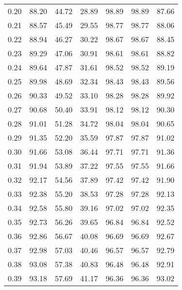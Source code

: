 \begin{tabular}{|c|c|c|c|c|c|c|}
      0.20 &     88.20 &     44.72 &      28.89 &   98.89 &      98.89 &         87.66 \\
      0.21 &     88.57 &     45.49 &      29.55 &   98.77 &      98.77 &         88.06 \\
      0.22 &     88.94 &     46.27 &      30.22 &   98.67 &      98.67 &         88.45 \\
      0.23 &     89.29 &     47.06 &      30.91 &   98.61 &      98.61 &         88.82 \\
      0.24 &     89.64 &     47.87 &      31.61 &   98.52 &      98.52 &         89.19 \\
      0.25 &     89.98 &     48.69 &      32.34 &   98.43 &      98.43 &         89.56 \\
      0.26 &     90.33 &     49.52 &      33.10 &   98.28 &      98.28 &         89.92 \\
      0.27 &     90.68 &     50.40 &      33.91 &   98.12 &      98.12 &         90.30 \\
      0.28 &     91.01 &     51.28 &      34.72 &   98.04 &      98.04 &         90.65 \\
      0.29 &     91.35 &     52.20 &      35.59 &   97.87 &      97.87 &         91.02 \\
      0.30 &     91.66 &     53.08 &      36.44 &   97.71 &      97.71 &         91.36 \\
      0.31 &     91.94 &     53.89 &      37.22 &   97.55 &      97.55 &         91.66 \\
      0.32 &     92.17 &     54.56 &      37.89 &   97.42 &      97.42 &         91.90 \\
      0.33 &     92.38 &     55.20 &      38.53 &   97.28 &      97.28 &         92.13 \\
      0.34 &     92.58 &     55.80 &      39.16 &   97.02 &      97.02 &         92.35 \\
      0.35 &     92.73 &     56.26 &      39.65 &   96.84 &      96.84 &         92.52 \\
      0.36 &     92.86 &     56.67 &      40.08 &   96.69 &      96.69 &         92.67 \\
      0.37 &     92.98 &     57.03 &      40.46 &   96.57 &      96.57 &         92.79 \\
      0.38 &     93.08 &     57.38 &      40.83 &   96.48 &      96.48 &         92.91 \\
      0.39 &     93.18 &     57.69 &      41.17 &   96.36 &      96.36 &         93.02 \\

\end{tabular}

